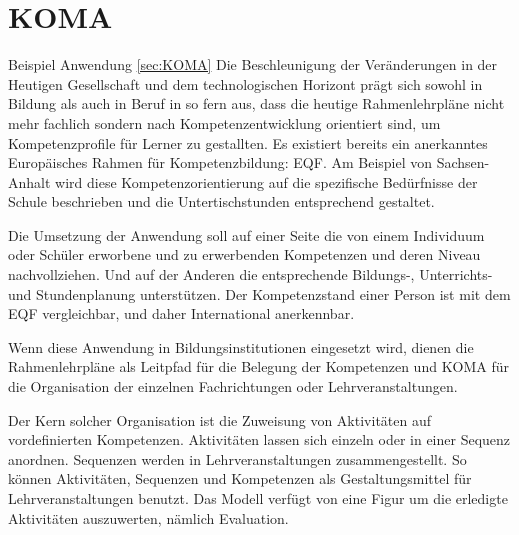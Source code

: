 \documentclass[
12pt,
english,
ngerman,
headsepline,
twoside,
openright,
numbers=noenddot,version=first
]{scrreprt}
\begin{document}
\section{KOMA}{Beispiel Anwendung}
\label{sec:KOMA} \autoref{sec:KOMA}
Die Beschleunigung der Veränderungen in der Heutigen Gesellschaft und dem technologischen Horizont prägt sich sowohl in Bildung als auch in Beruf in so fern aus, dass die heutige Rahmenlehrpläne nicht mehr fachlich sondern nach Kompetenzentwicklung orientiert sind, um Kompetenzprofile für Lerner zu gestallten. Es existiert bereits ein anerkanntes Europäisches Rahmen für Kompetenzbildung: \acrfull{EQF}. Am Beispiel von Sachsen-Anhalt\cite{BildungsServerSachsen} wird diese Kompetenzorientierung auf die spezifische Bedürfnisse der Schule beschrieben und die Untertischstunden entsprechend gestaltet.

Die Umsetzung der Anwendung soll auf einer Seite die von einem Individuum oder Schüler
erworbene und zu erwerbenden Kompetenzen und deren Niveau nachvollziehen. Und auf der Anderen die entsprechende Bildungs-, Unterrichts- und Stundenplanung unterstützen.
Der Kompetenzstand einer Person ist mit dem \acrshort{EQF} vergleichbar, und daher International anerkennbar.

Wenn diese Anwendung in Bildungsinstitutionen eingesetzt wird, dienen die Rahmenlehrpläne als Leitpfad für die Belegung der Kompetenzen und \acrshort{KOMA} für die Organisation der einzelnen Fachrichtungen oder Lehrveranstaltungen. 

Der Kern solcher Organisation ist die Zuweisung von Aktivitäten auf vordefinierten Kompetenzen. Aktivitäten lassen sich einzeln oder in einer Sequenz anordnen. Sequenzen werden in Lehrveranstaltungen zusammengestellt. So können Aktivitäten, Sequenzen und Kompetenzen
als Gestaltungsmittel für Lehrveranstaltungen benutzt. Das Modell verfügt von eine Figur um die erledigte Aktivitäten auszuwerten, nämlich Evaluation.
\end{document}
